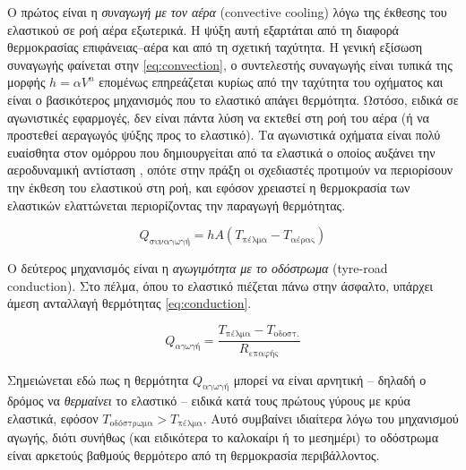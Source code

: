 Ο πρώτος είναι η \emph{συναγωγή με τον αέρα} (convective cooling) λόγω της έκθεσης του ελαστικού
σε ροή αέρα εξωτερικά. Η ψύξη αυτή εξαρτάται από τη διαφορά θερμοκρασίας
επιφάνειας–αέρα και από τη σχετική ταχύτητα. Η γενική εξίσωση συναγωγής φαίνεται στην \cref{eq:convection},
ο συντελεστής συναγωγής είναι τυπικά της μορφής $h = \alpha V^n$ επομένως επηρεάζεται κυρίως
από την ταχύτητα του οχήματος και είναι ο βασικότερος μηχανισμός που το ελαστικό απάγει θερμότητα.
Ωστόσο, ειδικά σε αγωνιστικές εφαρμογές, δεν είναι πάντα λύση να εκτεθεί στη ροή του αέρα (ή να προστεθεί
αεραγωγός ψύξης προς το ελαστικό). Τα αγωνιστικά οχήματα είναι πολύ ευαίσθητα στον ομόρρου που δημιουργείται
από τα ελαστικά ο οποίος αυξάνει την αεροδυναμική αντίσταση \cite{tyreWake}, οπότε στην πράξη οι σχεδιαστές προτιμούν
να περιορίσουν την έκθεση του ελαστικού στη ροή, και εφόσον χρειαστεί η θερμοκρασία των ελαστικών ελαττώνεται 
περιορίζοντας την παραγωγή θερμότητας. 


\begin{equation}
    Q_{\text{συναγωγή}} = hA(T_{\text{πέλμα}} - T_{\text{αέρας}})
    \label{eq:convection}
\end{equation}


Ο δεύτερος μηχανισμός είναι η \emph{αγωγιμότητα με το οδόστρωμα} (tyre-road conduction).
Στο πέλμα, όπου το ελαστικό πιέζεται πάνω στην άσφαλτο, υπάρχει άμεση ανταλλαγή
θερμότητας \cref{eq:conduction}.

\begin{equation}
    Q_{αγωγή} = \dfrac{T_{\text{πέλμα}} - T_{\text{οδοστ.}}}{R_{\text{επαφής}}}
    \label{eq:conduction}
\end{equation}

Σημειώνεται εδώ πως η θερμότητα $Q_{\text{αγωγή}}$ μπορεί να είναι αρνητική -- δηλαδή ο
δρόμος να \emph{θερμαίνει} το ελαστικό -- ειδικά κατά τους πρώτους γύρους με κρύα
ελαστικά, εφόσον $T_{\text{οδόστρωμα}} > T_{\text{πέλμα}}$. Αυτό
συμβαίνει ιδιαίτερα λόγω του μηχανισμού αγωγής, διότι συνήθως (και ειδικότερα
το καλοκαίρι ή το μεσημέρι) το οδόστρωμα είναι αρκετούς βαθμούς θερμότερο
από τη θερμοκρασία περιβάλλοντος.
